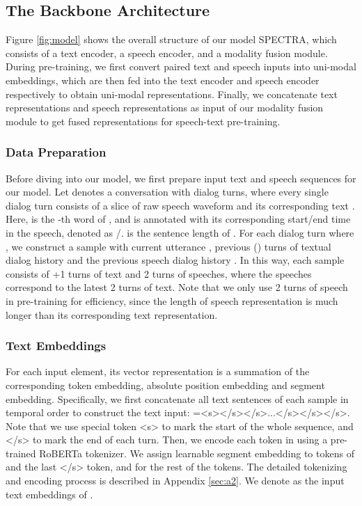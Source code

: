 \documentclass[11pt]{article}
\begin{document}
\subsection{The Backbone Architecture}
Figure \ref{fig:model} shows the overall structure of our model SPECTRA, which consists of a text encoder, a speech encoder, and a modality fusion module. During pre-training, we first convert paired text and speech inputs into uni-modal embeddings, which are then fed into the text encoder and speech encoder respectively to obtain uni-modal representations. Finally, we concatenate text representations and speech representations as input of our modality fusion module to get fused representations for speech-text pre-training.

\subsubsection{Data Preparation}
Before diving into our model, we first prepare input text and speech sequences for our model. 
Let  denotes a conversation with  dialog turns, where every single dialog turn  consists of a slice of raw speech waveform  and its corresponding text . 
Here,  is the -th word of , and is annotated with its corresponding start/end time in the speech, denoted as /. 
 is the sentence length of . 
For each dialog turn  where , we construct a sample  with current utterance , previous  () turns of textual dialog history  and the previous speech dialog history . In this way, each sample  consists of +1 turns of text and 2 turns of speeches, where the speeches correspond to the latest 2 turns of text.
Note that we only use 2 turns of speech in pre-training for efficiency, since the length of speech representation is much longer than its corresponding text representation.

\subsubsection{Text Embeddings}
For each input element, its vector representation is a summation of the corresponding token embedding, absolute position embedding and segment embedding.
Specifically, we first concatenate all text sentences of each sample  in temporal order to construct the text input:
=<s></s></s>...</s></s></s>.
Note that we use special token <s> to mark the start of the whole sequence, and </s> to mark the end of each turn.
Then, we encode each token in  using a pre-trained RoBERTa \citep{roberta} tokenizer.
We assign learnable segment embedding  to tokens of  and the last </s> token, and  for the rest of the tokens. The detailed tokenizing and encoding process is described in Appendix \ref{sec:a2}. We denote  as the input text embeddings of .
\end{document}
